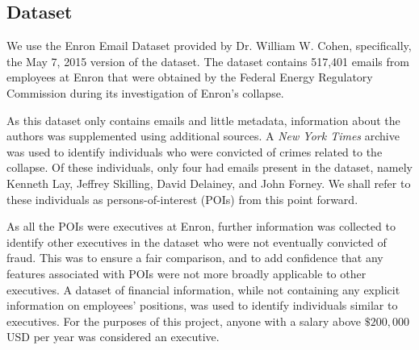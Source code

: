 \subsection{Dataset}

We use the Enron Email Dataset \cite{enron2015email} provided by Dr. William W. Cohen, specifically, the May 7, 2015 version of the dataset. The dataset contains 517,401 emails from employees at Enron that were obtained by the Federal Energy Regulatory Commission during its investigation of Enron's collapse. 

As this dataset only contains emails and little metadata, information about the authors was supplemented using additional sources. A \textit{New York Times} \cite{nytimes} archive was used to identify individuals who were convicted of crimes related to the collapse. Of these individuals, only four had emails present in the dataset, namely Kenneth Lay, Jeffrey Skilling, David Delainey, and John Forney. We shall refer to these individuals as persons-of-interest (POIs) from this point forward.

\begin{table}[t]
    \centering
    \caption{The breakdown of emails in our dataset including the number of emails in the training, validation, and test sets, and the number of POI, executive, and normal employee emails in each.}
    \label{tab:dataset_breakdown}
\end{table}

As all the POIs were executives at Enron, further information was collected to identify other executives in the dataset who were not eventually convicted of fraud. This was to ensure a fair comparison, and to add confidence that any features associated with POIs were not more broadly applicable to other executives. A dataset \cite{enron_financial_dataset} of financial information, while not containing any explicit information on employees' positions, was used to identify individuals similar to executives. For the purposes of this project, anyone with a salary above $\$200,000$ USD per year was considered an executive.



